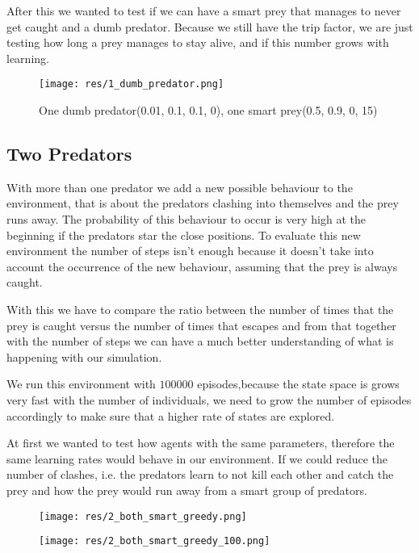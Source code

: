 \documentclass{article}
\begin{document}
After this we wanted to test if we can have a smart prey that manages to never
get caught and a dumb predator. Because we still have the trip
factor, we are just testing how long a prey manages to stay alive, and if this
number grows with learning.

\begin{figure}[htbp]
    \centering
    \texttt{[image: res/1\_dumb\_predator.png]}
    \caption{One dumb predator(0.01, 0.1, 0.1, 0), one smart prey(0.5, 0.9, 0, 15)}
\end{figure}



\subsection{Two Predators}
\label{twoP}
With more than one predator we add a new possible behaviour to the environment,
that is about the predators clashing into themselves and the prey runs away. The
probability of this behaviour to occur is very high at the beginning if the
predators star the close positions. To evaluate this new environment the number
of steps isn't enough because it doesn't take into account the occurrence of the
new behaviour, assuming that the prey is always caught. 

With this we have to compare the ratio between the number of times that the prey
is caught versus the number of times that escapes and from that together
with the number of steps we can have a much better understanding of what is
happening with our simulation.

We run this environment with $100000$ episodes,because the state space is grows
very fast with the number of individuals, we need to grow the number of episodes
accordingly to make sure that a higher rate of states are explored.

At first we wanted to test how agents with the same parameters, therefore
the same learning rates would behave in our environment. If we could reduce the
number of clashes, i.e. the predators learn to not kill each other and catch the
prey and how the prey would run away from a smart group of predators.

\begin{figure}[htbp]
	\centering
	\begin{minipage}[t]{.45\linewidth}
		\centering
		\texttt{[image: res/2\_both\_smart\_greedy.png]}
	\end{minipage}
	\begin{minipage}[t]{.45\linewidth}
		\centering
		\texttt{[image: res/2\_both\_smart\_greedy\_100.png]}
	\end{minipage}
\end{figure}
\end{document}
